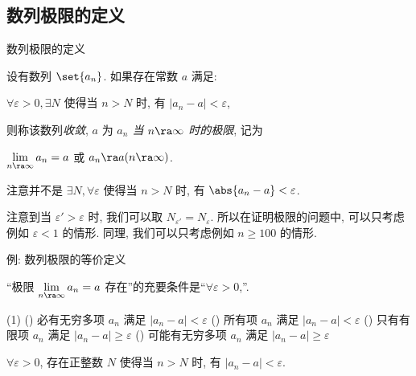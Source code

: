 \subsection{数列极限的定义}
\begin{frame}{数列极限的定义}
	\onslide<+->
	\begin{definition*}
		设有数列 $\set{a_n}$. 如果存在常数 $a$ 满足:
		\begin{center}
			\alert{$\forall\varepsilon>0, \exists N$ 使得当 $n>N$ 时, 有 $|a_n-a|<\varepsilon$},
		\end{center}
		则称该数列\emph{收敛}, $a$ 为 \emph{$a_n$ 当 $n \ra \infty$ 时的极限}, 记为
		\begin{center}
			\emph{$\lim\limits_{n\ra\infty}a_n=a$} 或 $a_n\ra a (n\ra \infty)$.
		\end{center}

	\end{definition*}
	\onslide<+->
	注意并不是 $\exists N,\forall\varepsilon$ 使得当 $n>N$ 时, 有 $\abs{a_n-a}<\varepsilon$.
	
	\onslide<+->
	注意到当 $\varepsilon'>\varepsilon$ 时, 我们可以取 $N_{\varepsilon'}=N_\varepsilon$.
	\onslide<+->
	所以在证明极限的问题中, 可以只考虑例如 $\varepsilon<1$ 的情形.
	\onslide<+->
	同理, 我们可以只考虑例如 $n\ge 100$ 的情形.
\end{frame}


\begin{frame}{例: 数列极限的等价定义}
	\onslide<+->
	\begin{example}
		“极限 $\lim\limits_{n\ra\infty}a_n=a$ 存在”的充要条件是“$\forall\varepsilon>0$,”.
		\begin{exchoice}(1)
			() 必有无穷多项 $a_n$ 满足 $|a_n-a|<\varepsilon$
			() 所有项 $a_n$ 满足 $|a_n-a|<\varepsilon$
			() 只有有限项 $a_n$ 满足 $|a_n-a|\ge \varepsilon$
			() 可能有无穷多项 $a_n$ 满足 $|a_n-a|\ge \varepsilon$
		\end{exchoice}
	\end{example}
	\onslide<+->
	\begin{solution}
		$\forall\varepsilon>0$, 存在正整数 $N$ 使得当 $n>N$ 时, 有 $|a_n-a|<\varepsilon$.
		\onslide<+->{对于 A , 反例 $a_n=(-1)^n, a=1$.}
	\end{solution}
\end{frame}


